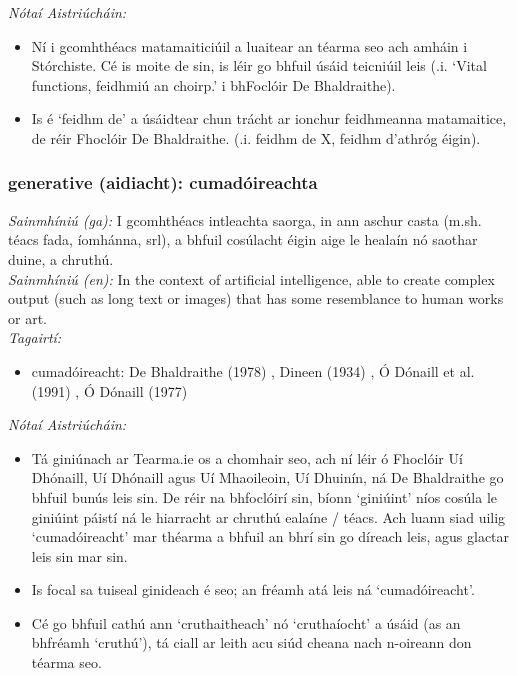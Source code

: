  \noindent \textit{Nótaí Aistriúcháin:}
\begin{itemize}
	\item Ní i gcomhthéacs matamaiticiúil a luaitear an téarma seo ach amháin i Stórchiste. Cé is moite de sin, is léir go bhfuil úsáid teicniúil leis (.i. `Vital functions, feidhmiú an choirp.' i bhFoclóir De Bhaldraithe).
	\item Is é `feidhm de' a úsáidtear chun trácht ar ionchur feidhmeanna matamaitice, de réir Fhoclóir De Bhaldraithe. (.i. feidhm de X, feidhm d'athróg éigin).
\end{itemize}


\subsubsection*{generative (aidiacht): cumadóireachta}
 \noindent \textit{Sainmhíniú (ga):} I gcomhthéacs intleachta saorga, in ann aschur casta (m.sh. téacs fada, íomhánna, srl), a bhfuil cosúlacht éigin aige le healaín nó saothar duine, a chruthú.
\\
 \noindent \textit{Sainmhíniú (en):} In the context of artificial intelligence, able to create complex output (such as long text or images) that has some resemblance to human works or art.
\\
 \noindent \textit{Tagairtí:}
\begin{itemize}
	\item cumadóireacht: De Bhaldraithe (1978) \cite{de-bhaldraithe}, Dineen (1934) \cite{dineen}, Ó Dónaill et al. (1991) \cite{focloir-beag}, Ó Dónaill (1977) \cite{odonaill}
\end{itemize}

 \noindent \textit{Nótaí Aistriúcháin:}
\begin{itemize}
	\item Tá giniúnach ar Tearma.ie os a chomhair seo, ach ní léir ó Fhoclóir Uí Dhónaill, Uí Dhónaill agus Uí Mhaoileoin, Uí Dhuinín, ná De Bhaldraithe go bhfuil bunús leis sin. De réir na bhfoclóirí sin, bíonn `giniúint' níos cosúla le giniúint páistí ná le hiarracht ar chruthú ealaíne / téacs. Ach luann siad uilig `cumadóireacht' mar théarma a bhfuil an bhrí sin go díreach leis, agus glactar leis sin mar sin.
	\item Is focal sa tuiseal ginideach é seo; an fréamh atá leis ná `cumadóireacht'.
	\item Cé go bhfuil cathú ann `cruthaitheach' nó `cruthaíocht' a úsáid (as an bhfréamh `cruthú'), tá ciall ar leith acu siúd cheana nach n-oireann don téarma seo.
\end{itemize}


